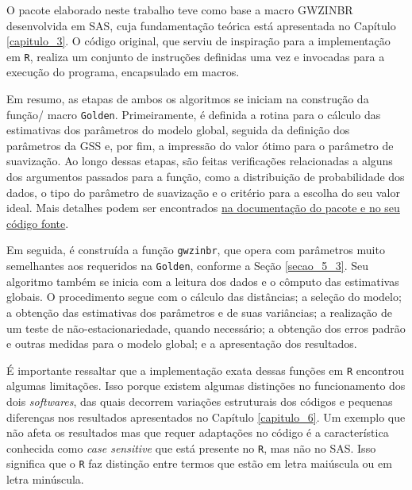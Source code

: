 \documentclass[12pt, a4paper, twoside]{report}
\numberwithin{equation}{section} %
\begin{document}
O pacote elaborado neste trabalho teve como base a macro GWZINBR desenvolvida em SAS, cuja fundamentação teórica está apresentada no Capítulo \ref{capitulo_3}. O código original, que serviu de inspiração para a implementação em \texttt{R}, realiza um conjunto de instruções definidas uma vez e invocadas para a execução do programa, encapsulado em macros. 

Em resumo, as etapas de ambos os algoritmos se iniciam na construção da função/ macro \texttt{Golden}. Primeiramente, é definida a rotina para o cálculo das estimativas dos parâmetros do modelo global, seguida da definição dos parâmetros da GSS e, por fim, a impressão do valor ótimo para o parâmetro de suavização. Ao longo dessas etapas, são feitas verificações relacionadas a alguns dos argumentos passados para a função, como a distribuição de probabilidade dos dados, o tipo do parâmetro de suavização e o critério para a escolha do seu valor ideal. Mais detalhes podem ser encontrados \href{https://cran.r-project.org/web/packages/gwzinbr/index.html}{na documentação do pacote e no seu código fonte}.


Em seguida, é construída a função \texttt{gwzinbr}, que opera com parâmetros muito semelhantes aos requeridos na \texttt{Golden}, conforme a Seção \ref{secao_5_3}. Seu algoritmo também se inicia com a leitura dos dados e o cômputo das estimativas globais. O procedimento segue com o cálculo das distâncias; a seleção do modelo; a obtenção das estimativas dos parâmetros e de suas variâncias; a realização de um teste de não-estacionariedade, quando necessário; a obtenção dos erros padrão e outras medidas para o modelo global; e a apresentação dos resultados.  

É importante ressaltar que a implementação exata dessas funções em \texttt{R} encontrou algumas limitações. Isso porque existem algumas distinções no funcionamento dos dois \textit{softwares}, das quais decorrem variações estruturais dos códigos e pequenas diferenças nos resultados apresentados no Capítulo \ref{capitulo_6}. Um exemplo que não afeta os resultados mas que requer adaptações no código é a característica conhecida como \textit{case sensitive} que está presente no \texttt{R}, mas não no SAS. Isso significa que o \texttt{R} faz distinção entre termos que estão em letra maiúscula ou em letra minúscula.
\end{document}
